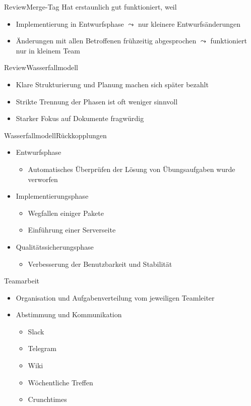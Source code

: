 \documentclass[10pt]{beamer}
\begin{document}
\begin{frame}{Review}{Merge-Tag}
Hat erstaunlich gut funktioniert, weil
	\begin{itemize}
		\item Implementierung in Entwurfsphase $\leadsto$ nur kleinere Entwurfsänderungen %
		\item Änderungen mit allen Betroffenen frühzeitig abgesprochen $\leadsto$ funktioniert nur in kleinem Team
	\end{itemize}
\end{frame}

\begin{frame}{Review}{Wasserfallmodell}
	\begin{itemize}
		\item Klare Strukturierung und Planung machen sich später bezahlt
		\item Strikte Trennung der Phasen ist oft weniger sinnvoll
		\item Starker Fokus auf Dokumente fragwürdig
	\end{itemize}
\end{frame}


\begin{frame}{Wasserfallmodell}{Rückkopplungen}
\begin{itemize}
	\item Entwurfsphase
	\begin{itemize}
			\item Automatisches Überprüfen der Lösung von Übungsaufgaben wurde verworfen
	\end{itemize}
	\item Implementierungsphase
	\begin{itemize}
		\item Wegfallen einiger Pakete
		\item Einführung einer Serverseite
	\end{itemize}
	\item Qualitätssicherungsphase
	\begin{itemize}
		\item Verbesserung der Benutzbarkeit und Stabilität
	\end{itemize}
\end{itemize}
\end{frame}


\begin{frame}{Teamarbeit}{}
	\begin{itemize}
		\item Organisation und Aufgabenverteilung vom jeweiligen Teamleiter
		\item Abstimmung und Kommunikation
		\begin{itemize}
			\item Slack
			\item Telegram
			\item Wiki
			\item Wöchentliche Treffen
			\item Crunchtimes
		\end{itemize}
	\end{itemize}
\end{frame}
\end{document}
